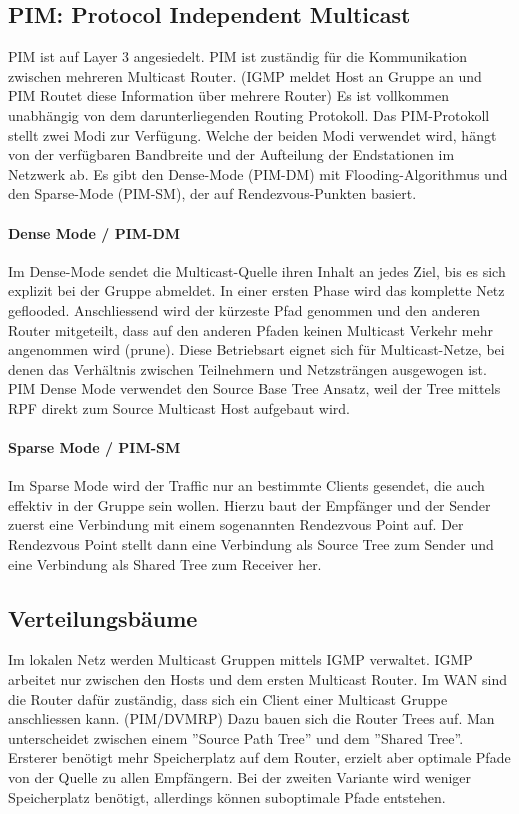 \subsection{PIM: Protocol Independent Multicast}
PIM ist auf Layer 3 angesiedelt. PIM ist zuständig für die Kommunikation zwischen mehreren Multicast Router. (IGMP meldet Host an Gruppe an und PIM Routet diese Information über mehrere Router) Es ist vollkommen unabhängig von dem darunterliegenden Routing Protokoll. Das PIM-Protokoll stellt zwei Modi zur Verfügung. Welche der beiden Modi verwendet wird, hängt von der verfügbaren Bandbreite und der Aufteilung der Endstationen im Netzwerk ab. Es gibt den Dense-Mode (PIM-DM) mit Flooding-Algorithmus und den Sparse-Mode (PIM-SM), der auf Rendezvous-Punkten basiert.

\paragraph{Dense Mode / PIM-DM}
Im Dense-Mode sendet die Multicast-Quelle ihren Inhalt an jedes Ziel, bis es sich explizit bei der Gruppe abmeldet. In einer ersten Phase wird das komplette Netz geflooded. Anschliessend wird der kürzeste Pfad genommen und den anderen Router mitgeteilt, dass auf den anderen Pfaden keinen Multicast Verkehr mehr angenommen wird (prune). Diese Betriebsart eignet sich für Multicast-Netze, bei denen das Verhältnis zwischen Teilnehmern und Netzsträngen ausgewogen ist. PIM Dense Mode verwendet den Source Base Tree Ansatz, weil der Tree mittels RPF direkt zum Source Multicast Host aufgebaut wird.

\paragraph{Sparse Mode / PIM-SM}
Im Sparse Mode wird der Traffic nur an bestimmte Clients gesendet, die auch effektiv in der Gruppe sein wollen. Hierzu baut der Empfänger und der Sender zuerst eine Verbindung mit einem sogenannten Rendezvous Point auf. Der Rendezvous Point stellt dann eine Verbindung als Source Tree zum Sender und eine Verbindung als Shared Tree zum Receiver her. 


\subsection{Verteilungsbäume}
Im lokalen Netz werden Multicast Gruppen mittels IGMP verwaltet. IGMP arbeitet nur zwischen den Hosts und dem ersten Multicast Router. Im WAN sind die Router dafür zuständig, dass sich ein Client einer Multicast Gruppe anschliessen kann. (PIM/DVMRP) Dazu bauen sich die Router Trees auf. Man unterscheidet zwischen einem ''Source Path Tree'' und dem ''Shared Tree''. Ersterer benötigt mehr Speicherplatz auf dem Router, erzielt aber optimale Pfade von der Quelle zu allen Empfängern. Bei der zweiten Variante wird weniger Speicherplatz benötigt, allerdings können suboptimale Pfade entstehen. 

